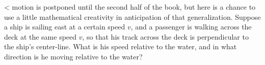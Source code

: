  <%
motion is postponed until the second half of the book, but
here is a chance to use a little mathematical creativity in
anticipation of that generalization. Suppose a ship is
sailing east at a certain speed $v$, and a passenger is
walking across the deck at the same speed $v$, so that his
track across the deck is perpendicular to the ship's
center-line. What is his speed relative to the water, and in
what direction is he moving relative to the water?
